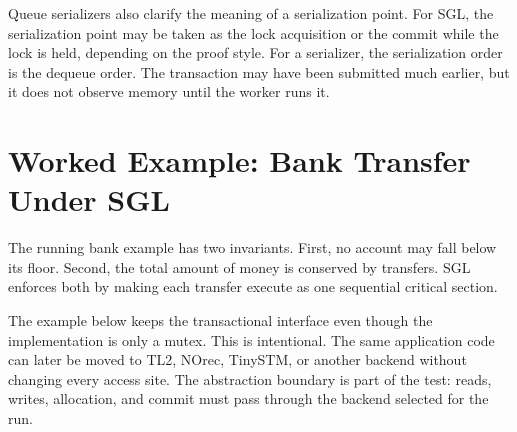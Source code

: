 Queue serializers also clarify the meaning of a serialization point. For SGL, the serialization point may be taken as the lock acquisition or the commit while the lock is held, depending on the proof style. For a serializer, the serialization order is the dequeue order. The transaction may have been submitted much earlier, but it does not observe memory until the worker runs it.

\section{Worked Example: Bank Transfer Under SGL}
\label{sec:worked-sgl-bank}

The running bank example has two invariants. First, no account may fall below its floor. Second, the total amount of money is conserved by transfers. SGL enforces both by making each transfer execute as one sequential critical section.

The example below keeps the transactional interface even though the implementation is only a mutex. This is intentional. The same application code can later be moved to TL2, NOrec, TinySTM, or another backend without changing every access site. The abstraction boundary is part of the test: reads, writes, allocation, and commit must pass through the backend selected for the run.


